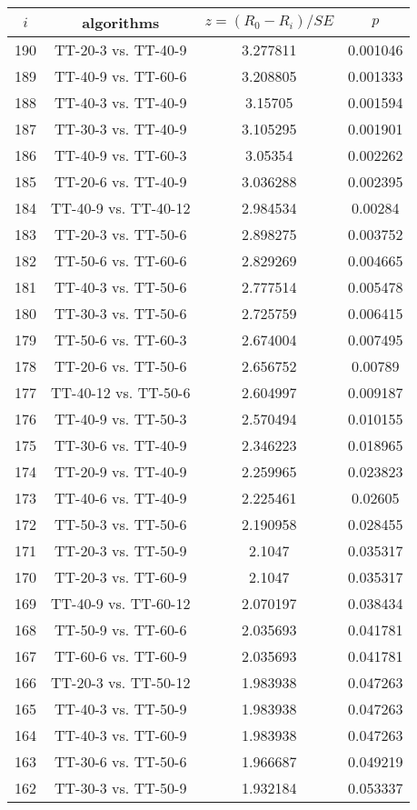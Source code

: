 \documentclass[a4paper,10pt]{article}
\begin{document}
\begin{landscape}
\begin{table}[!htp]
\centering\scriptsize
\begin{tabular}{cccc}
$i$&algorithms&$z=(R_0 - R_i)/SE$&$p$\\
\hline190&TT-20-3 vs. TT-40-9&3.277811&0.001046\\
189&TT-40-9 vs. TT-60-6&3.208805&0.001333\\
188&TT-40-3 vs. TT-40-9&3.15705&0.001594\\
187&TT-30-3 vs. TT-40-9&3.105295&0.001901\\
186&TT-40-9 vs. TT-60-3&3.05354&0.002262\\
185&TT-20-6 vs. TT-40-9&3.036288&0.002395\\
184&TT-40-9 vs. TT-40-12&2.984534&0.00284\\
183&TT-20-3 vs. TT-50-6&2.898275&0.003752\\
182&TT-50-6 vs. TT-60-6&2.829269&0.004665\\
181&TT-40-3 vs. TT-50-6&2.777514&0.005478\\
180&TT-30-3 vs. TT-50-6&2.725759&0.006415\\
179&TT-50-6 vs. TT-60-3&2.674004&0.007495\\
178&TT-20-6 vs. TT-50-6&2.656752&0.00789\\
177&TT-40-12 vs. TT-50-6&2.604997&0.009187\\
176&TT-40-9 vs. TT-50-3&2.570494&0.010155\\
175&TT-30-6 vs. TT-40-9&2.346223&0.018965\\
174&TT-20-9 vs. TT-40-9&2.259965&0.023823\\
173&TT-40-6 vs. TT-40-9&2.225461&0.02605\\
172&TT-50-3 vs. TT-50-6&2.190958&0.028455\\
171&TT-20-3 vs. TT-50-9&2.1047&0.035317\\
170&TT-20-3 vs. TT-60-9&2.1047&0.035317\\
169&TT-40-9 vs. TT-60-12&2.070197&0.038434\\
168&TT-50-9 vs. TT-60-6&2.035693&0.041781\\
167&TT-60-6 vs. TT-60-9&2.035693&0.041781\\
166&TT-20-3 vs. TT-50-12&1.983938&0.047263\\
165&TT-40-3 vs. TT-50-9&1.983938&0.047263\\
164&TT-40-3 vs. TT-60-9&1.983938&0.047263\\
163&TT-30-6 vs. TT-50-6&1.966687&0.049219\\
162&TT-30-3 vs. TT-50-9&1.932184&0.053337\\

\end{tabular}
\end{table}
\end{landscape}
\end{document}
